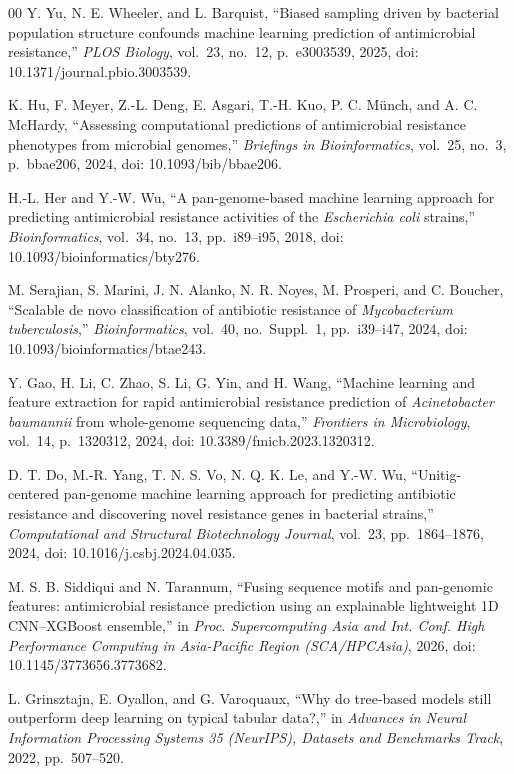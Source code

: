 \documentclass[conference]{IEEEtran}
\begin{document}
\begin{thebibliography}{00}
 Y. Yu, N. E. Wheeler, and L. Barquist, ``Biased sampling driven by bacterial population structure confounds machine learning prediction of antimicrobial resistance,'' \textit{PLOS Biology}, vol.~23, no.~12, p.~e3003539, 2025, doi: 10.1371/journal.pbio.3003539.

 K. Hu, F. Meyer, Z.-L. Deng, E. Asgari, T.-H. Kuo, P. C. M\"{u}nch, and A. C. McHardy, ``Assessing computational predictions of antimicrobial resistance phenotypes from microbial genomes,'' \textit{Briefings in Bioinformatics}, vol.~25, no.~3, p.~bbae206, 2024, doi: 10.1093/bib/bbae206.

 H.-L. Her and Y.-W. Wu, ``A pan-genome-based machine learning approach for predicting antimicrobial resistance activities of the \textit{Escherichia coli} strains,'' \textit{Bioinformatics}, vol.~34, no.~13, pp.~i89--i95, 2018, doi: 10.1093/bioinformatics/bty276.

 M. Serajian, S. Marini, J. N. Alanko, N. R. Noyes, M. Prosperi, and C. Boucher, ``Scalable de novo classification of antibiotic resistance of \textit{Mycobacterium tuberculosis},'' \textit{Bioinformatics}, vol.~40, no.~Suppl.~1, pp.~i39--i47, 2024, doi: 10.1093/bioinformatics/btae243.

 Y. Gao, H. Li, C. Zhao, S. Li, G. Yin, and H. Wang, ``Machine learning and feature extraction for rapid antimicrobial resistance prediction of \textit{Acinetobacter baumannii} from whole-genome sequencing data,'' \textit{Frontiers in Microbiology}, vol.~14, p.~1320312, 2024, doi: 10.3389/fmicb.2023.1320312.

 D. T. Do, M.-R. Yang, T. N. S. Vo, N. Q. K. Le, and Y.-W. Wu, ``Unitig-centered pan-genome machine learning approach for predicting antibiotic resistance and discovering novel resistance genes in bacterial strains,'' \textit{Computational and Structural Biotechnology Journal}, vol.~23, pp.~1864--1876, 2024, doi: 10.1016/j.csbj.2024.04.035.

 M. S. B. Siddiqui and N. Tarannum, ``Fusing sequence motifs and pan-genomic features: antimicrobial resistance prediction using an explainable lightweight 1D CNN--XGBoost ensemble,'' in \textit{Proc. Supercomputing Asia and Int. Conf. High Performance Computing in Asia-Pacific Region (SCA/HPCAsia)}, 2026, doi: 10.1145/3773656.3773682.

 L. Grinsztajn, E. Oyallon, and G. Varoquaux, ``Why do tree-based models still outperform deep learning on typical tabular data?,'' in \textit{Advances in Neural Information Processing Systems 35 (NeurIPS), Datasets and Benchmarks Track}, 2022, pp.~507--520.


\end{thebibliography}
\end{document}

